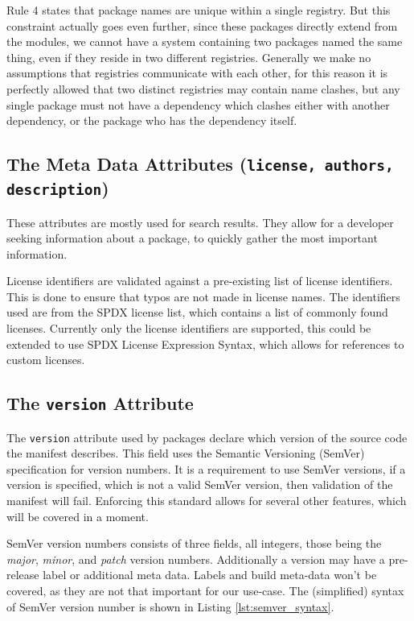 Rule 4 states that package names are unique within a single registry. But this
constraint actually goes even further, since these packages directly extend
from the modules, we cannot have a system containing two packages named the
same thing, even if they reside in two different registries. Generally we make
no assumptions that registries communicate with each other, for this reason it
is perfectly allowed that two distinct registries may contain name clashes, but
any single package must not have a dependency which clashes either with another
dependency, or the package who has the dependency itself.

\subsection{The Meta Data Attributes ({\tt license, authors, description})}

These attributes are mostly used for search results. They allow for a developer
seeking information about a package, to quickly gather the most important
information.

License identifiers are validated against a pre-existing list of license
identifiers. This is done to ensure that typos are not made in license names.
The identifiers used are from the SPDX license list, which contains a list of
commonly found licenses. Currently only the license identifiers are supported,
this could be extended to use SPDX License Expression Syntax, which allows for
references to custom licenses.

\subsection{The {\tt version} Attribute}
\label{sec:versions}


The \texttt{version} attribute used by packages declare which version
of the source code the manifest describes. This field uses the Semantic
Versioning (SemVer) specification for version numbers. It is a requirement to
use SemVer versions, if a version is specified, which is not a valid SemVer
version, then validation of the manifest will fail. Enforcing this standard
allows for several other features, which will be covered in a moment.

SemVer version numbers consists of three fields, all integers, those being the
\emph{major}, \emph{minor}, and \emph{patch} version numbers. Additionally a
version may have a pre-release label or additional meta data. Labels and build
meta-data won't be covered, as they are not that important for our use-case.
The (simplified) syntax of SemVer version number is shown in Listing
\ref{lst:semver_syntax}.

